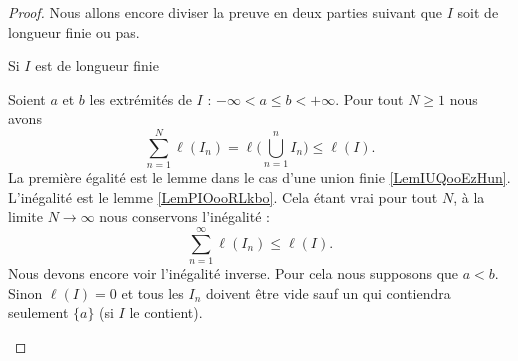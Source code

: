\begin{proof}
    Nous allons encore diviser la preuve en deux parties suivant que \( I\) soit de longueur finie ou pas.   
    \begin{subproof}

        \item[Si \( I\) est de longueur finie]
        
            Soient \( a\) et \( b\) les extrémités de \( I\) : \( -\infty<a\leq b< +\infty\). Pour tout \( N\geq 1\) nous avons
            \begin{equation}
                \sum_{n=1}^N\ell(I_n)=\ell\big( \bigcup_{n=1}^nI_n \big)\leq \ell(I).
            \end{equation}
            La première égalité est le lemme dans le cas d'une union finie \ref{LemIUQooEzHun}. L'inégalité est le lemme \ref{LemPIOooRLkbo}. Cela étant vrai pour tout $N$, à la limite \( N\to\infty\) nous conservons l'inégalité :
            \begin{equation}
                \sum_{n=1}^{\infty}\ell(I_n)\leq \ell(I).
            \end{equation}
            Nous devons encore voir l'inégalité inverse. Pour cela nous supposons que \( a<b\). Sinon \( \ell(I)=0\) et tous les \( I_n\) doivent être vide sauf un qui contiendra seulement \( \{ a \}\) (si \( I\) le contient).


\end{subproof}
\end{proof}
